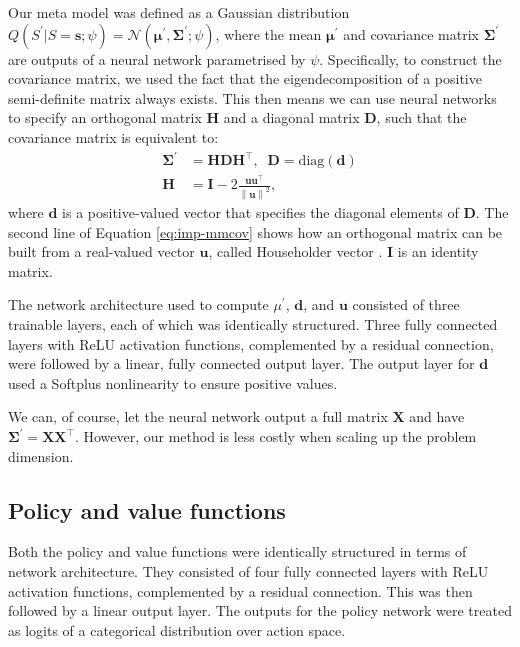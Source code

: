 \documentclass[utf8]{frontiersSCNS}
\newcommand{\norm}[1]{\left\lVert#1\right\rVert}
\newcommand{\bs}{\boldsymbol}
\begin{document}
Our meta model was defined as a Gaussian distribution $Q(S^\prime|S=\bs{s}; \psi) = \mathcal N(\bs{\mu}^\prime, \bs{\Sigma}^\prime; \psi)$, where the mean $\bs{\mu}^\prime$ and covariance matrix $\bs{\Sigma}^\prime$ are outputs of a neural network parametrised by $\psi$. Specifically, to construct the covariance matrix, we used the fact that the eigendecomposition of a positive semi-definite matrix always exists. This then means we can use neural networks to specify an orthogonal matrix $\bs H$ and a diagonal matrix $\bs D$, such that the covariance matrix is equivalent to:
%
	\begin{equation}
	\begin{aligned} \label{eq:imp-mmcov}
	\bs{\Sigma}^\prime &= \bs{H} \bs{D} \bs{H}^\intercal, \;\; \bs{D} = \mathrm{diag}(\bs{d}) \\
	\bs{H} &= \bs{I} - 2\frac{\bs{uu}^\intercal}{\norm{\bs{u}}^2},
	\end{aligned}
	\end{equation}
%
where $\bs{d}$ is a positive-valued vector that specifies the diagonal elements of $\bs D$. The second line of Equation \ref{eq:imp-mmcov} shows how an orthogonal matrix can be built from a real-valued vector $\bs u$, called Householder vector \citep{householderflow}. $\bs I$ is an identity matrix. 

The network architecture used to compute $\mu^\prime$, $\bs d$, and $\bs u$ consisted of three trainable layers, each of which was identically structured. Three fully connected layers with ReLU activation functions, complemented by a residual connection, were followed by a linear, fully connected output layer. The output layer for $\bs d$ used a Softplus nonlinearity to ensure positive values.

We can, of course, let the neural network output a full matrix $\bs X$ and have $\bs\Sigma^\prime=\bs{XX}^\intercal$. However, our method is less costly when scaling up the problem dimension.

\subsection{Policy and value functions}

Both the policy and value functions were identically structured in terms of network architecture. They consisted of four fully connected layers with ReLU activation functions, complemented by a residual connection. This was then followed by a linear output layer. The outputs for the policy network were treated as logits of a categorical distribution over action space. 
\end{document}
